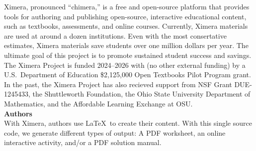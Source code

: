 \documentclass{article}
\begin{document}
\begin{multicols}{2}
    Ximera, pronounced ``chimera,'' is a free and
    open-source platform that provides tools for authoring and publishing
    open-source, interactive educational content, such
    as textbooks, assessments, and online courses. Currently, Ximera materials
    are used at around a dozen institutions. Even with the most consertative
    estimates, Ximera materials save students over one million dollars per
    year.
    The ultimate goal of this project is to promote
    sustained student success and savings.\\[.3cm]

    The Ximera Project is funded 2024--2026 with (no other external funding) by
    a U.S.\ Department of Education \$2,125,000
    Open Textbooks Pilot Program grant. In the past, the Ximera Project has
    also recieved support from NSF Grant
    DUE-1245433, the Shuttleworth Foundation, the Ohio State University
    Department of Mathematics, and the Affordable Learning Exchange at OSU.
    \\[.5cm]
    {\sffamily\bfseries Authors}\\
    With Ximera, authors use \LaTeX\ to create their content. With this
    single source code, we generate different types of output: A PDF worksheet,
    an	online interactive activity, and/or a PDF solution manual.
    \begin{center}
\end{center}
\end{multicols}
\end{document}
